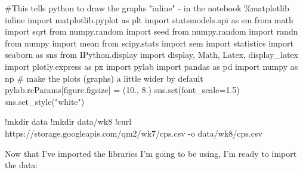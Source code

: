 \documentclass[
  letterpaper,
  DIV=11,
  numbers=noendperiod]{scrreprt}
\newenvironment{Shaded}{\begin{snugshade}}{\end{snugshade}}
\newcommand{\BuiltInTok}[1]{\textcolor[rgb]{0.00,0.23,0.31}{#1}}
\newcommand{\CommentTok}[1]{\textcolor[rgb]{0.37,0.37,0.37}{#1}}
\newcommand{\FloatTok}[1]{\textcolor[rgb]{0.68,0.00,0.00}{#1}}
\newcommand{\ImportTok}[1]{\textcolor[rgb]{0.00,0.46,0.62}{#1}}
\newcommand{\NormalTok}[1]{\textcolor[rgb]{0.00,0.23,0.31}{#1}}
\newcommand{\OperatorTok}[1]{\textcolor[rgb]{0.37,0.37,0.37}{#1}}
\newcommand{\StringTok}[1]{\textcolor[rgb]{0.13,0.47,0.30}{#1}}
\begin{document}
\begin{Shaded}
\begin{Highlighting}[]
\CommentTok{\#This tells python to draw the graphs "inline" {-} in the notebook}
\OperatorTok{\%}\NormalTok{matplotlib inline  }
\ImportTok{import}\NormalTok{ matplotlib.pyplot }\ImportTok{as}\NormalTok{ plt}
\ImportTok{import}\NormalTok{ statsmodels.api }\ImportTok{as}\NormalTok{ sm}
\ImportTok{from}\NormalTok{ math }\ImportTok{import}\NormalTok{ sqrt}
\ImportTok{from}\NormalTok{ numpy.random }\ImportTok{import}\NormalTok{ seed}
\ImportTok{from}\NormalTok{ numpy.random }\ImportTok{import}\NormalTok{ randn}
\ImportTok{from}\NormalTok{ numpy }\ImportTok{import}\NormalTok{ mean}
\ImportTok{from}\NormalTok{ scipy.stats }\ImportTok{import}\NormalTok{ sem}
\ImportTok{import}\NormalTok{ statistics }
\ImportTok{import}\NormalTok{ seaborn }\ImportTok{as}\NormalTok{ sns}
\ImportTok{from}\NormalTok{ IPython.display }\ImportTok{import}\NormalTok{ display, Math, Latex, display\_latex}
\ImportTok{import}\NormalTok{ plotly.express }\ImportTok{as}\NormalTok{ px}
\ImportTok{import}\NormalTok{ pylab}
\ImportTok{import}\NormalTok{ pandas }\ImportTok{as}\NormalTok{ pd}
\ImportTok{import}\NormalTok{ numpy }\ImportTok{as}\NormalTok{ np}
\CommentTok{\# make the plots (graphs) a little wider by default}
\NormalTok{pylab.rcParams[}\StringTok{\textquotesingle{}figure.figsize\textquotesingle{}}\NormalTok{] }\OperatorTok{=}\NormalTok{ (}\FloatTok{10.}\NormalTok{, }\FloatTok{8.}\NormalTok{)}
\NormalTok{sns.}\BuiltInTok{set}\NormalTok{(font\_scale}\OperatorTok{=}\FloatTok{1.5}\NormalTok{)}
\NormalTok{sns.set\_style(}\StringTok{"white"}\NormalTok{)}

\end{Highlighting}
\end{Shaded}

\begin{Shaded}
\begin{Highlighting}[]
\OperatorTok{!}\NormalTok{mkdir data}
\OperatorTok{!}\NormalTok{mkdir data}\OperatorTok{/}\NormalTok{wk8}
\OperatorTok{!}\NormalTok{curl https:}\OperatorTok{//}\NormalTok{storage.googleapis.com}\OperatorTok{/}\NormalTok{qm2}\OperatorTok{/}\NormalTok{wk7}\OperatorTok{/}\NormalTok{cps.csv }\OperatorTok{{-}}\NormalTok{o data}\OperatorTok{/}\NormalTok{wk8}\OperatorTok{/}\NormalTok{cps.csv}
\end{Highlighting}
\end{Shaded}

Now that I've imported the libraries I'm going to be using, I'm ready to
import the data:
\end{document}
